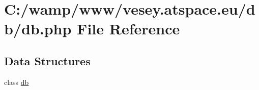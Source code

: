 \hypertarget{db_8php}{\section{C\-:/wamp/www/vesey.atspace.\-eu/db/db.php File Reference}
\label{db_8php}
}
\subsection*{Data Structures}
\begin{DoxyCompactItemize}
\item 
class \hyperlink{classdb}{db}
\end{DoxyCompactItemize}
